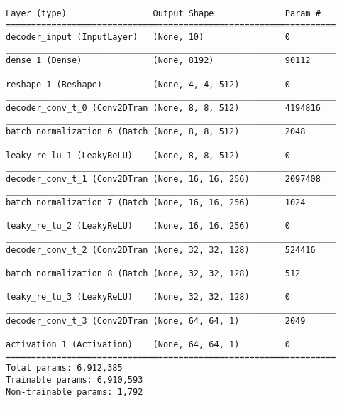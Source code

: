 \begin{lstlisting}[caption={(dSprites, 7,500, 6,250, 5,000, 3,750)-VAE Decoder},captionpos=b,basicstyle=\tiny, label={lst:dsprites-vae-decoder}]
_________________________________________________________________
Layer (type)                 Output Shape              Param #
=================================================================
decoder_input (InputLayer)   (None, 10)                0
_________________________________________________________________
dense_1 (Dense)              (None, 8192)              90112
_________________________________________________________________
reshape_1 (Reshape)          (None, 4, 4, 512)         0
_________________________________________________________________
decoder_conv_t_0 (Conv2DTran (None, 8, 8, 512)         4194816
_________________________________________________________________
batch_normalization_6 (Batch (None, 8, 8, 512)         2048
_________________________________________________________________
leaky_re_lu_1 (LeakyReLU)    (None, 8, 8, 512)         0
_________________________________________________________________
decoder_conv_t_1 (Conv2DTran (None, 16, 16, 256)       2097408
_________________________________________________________________
batch_normalization_7 (Batch (None, 16, 16, 256)       1024
_________________________________________________________________
leaky_re_lu_2 (LeakyReLU)    (None, 16, 16, 256)       0
_________________________________________________________________
decoder_conv_t_2 (Conv2DTran (None, 32, 32, 128)       524416
_________________________________________________________________
batch_normalization_8 (Batch (None, 32, 32, 128)       512
_________________________________________________________________
leaky_re_lu_3 (LeakyReLU)    (None, 32, 32, 128)       0
_________________________________________________________________
decoder_conv_t_3 (Conv2DTran (None, 64, 64, 1)         2049
_________________________________________________________________
activation_1 (Activation)    (None, 64, 64, 1)         0
=================================================================
Total params: 6,912,385
Trainable params: 6,910,593
Non-trainable params: 1,792
_________________________________________________________________
\end{lstlisting}